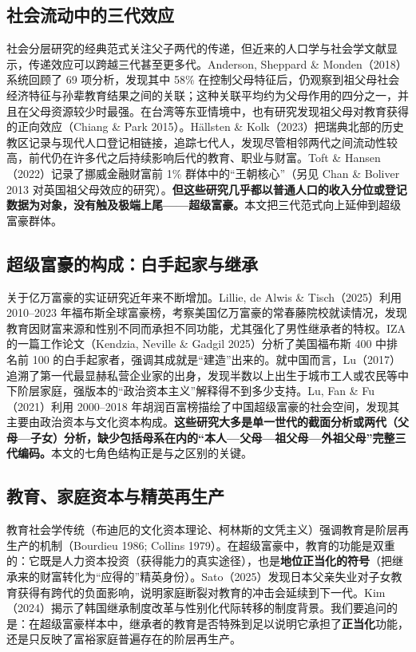 \documentclass[UTF8,a4paper,11pt]{ctexart}
\begin{document}
\subsection{社会流动中的三代效应}

社会分层研究的经典范式关注父子两代的传递，但近来的人口学与社会学文献显示，传递效应可以跨越三代甚至更多代。Anderson, Sheppard \& Monden（2018）系统回顾了 69 项分析，发现其中 58\% 在控制父母特征后，仍观察到祖父母社会经济特征与孙辈教育结果之间的关联；这种关联平均约为父母作用的四分之一，并且在父母资源较少时最强。在台湾等东亚情境中，也有研究发现祖父母对教育获得的正向效应（Chiang \& Park 2015）。Hällsten \& Kolk（2023）把瑞典北部的历史教区记录与现代人口登记相链接，追踪七代人，发现尽管相邻两代之间流动性较高，前代仍在许多代之后持续影响后代的教育、职业与财富。Toft \& Hansen（2022）记录了挪威金融财富前 1\% 群体中的“王朝核心”（另见 Chan \& Boliver 2013 对英国祖父母效应的研究）。\textbf{但这些研究几乎都以普通人口的收入分位或登记数据为对象，没有触及极端上尾——超级富豪。}本文把三代范式向上延伸到超级富豪群体。

\subsection{超级富豪的构成：白手起家与继承}

关于亿万富豪的实证研究近年来不断增加。Lillie, de Alwis \& Tisch（2025）利用 2010--2023 年福布斯全球富豪榜，考察美国亿万富豪的常春藤院校就读情况，发现教育因财富来源和性别不同而承担不同功能，尤其强化了男性继承者的特权。IZA 的一篇工作论文（Kendzia, Neville \& Gadgil 2025）分析了美国福布斯 400 中排名前 100 的白手起家者，强调其成就是“建造”出来的。就中国而言，Lu（2017）追溯了第一代最显赫私营企业家的出身，发现半数以上出生于城市工人或农民等中下阶层家庭，强版本的“政治资本主义”解释得不到多少支持。Lu, Fan \& Fu（2021）利用 2000--2018 年胡润百富榜描绘了中国超级富豪的社会空间，发现其主要由政治资本与文化资本构成。\textbf{这些研究大多是单一世代的截面分析或两代（父母—子女）分析，缺少包括母系在内的“本人—父母—祖父母—外祖父母”完整三代编码。}本文的七角色结构正是与之区别的关键。

\subsection{教育、家庭资本与精英再生产}

教育社会学传统（布迪厄的文化资本理论、柯林斯的文凭主义）强调教育是阶层再生产的机制（Bourdieu 1986; Collins 1979）。在超级富豪中，教育的功能是双重的：它既是人力资本投资（获得能力的真实途径），也是\textbf{地位正当化的符号}（把继承来的财富转化为“应得的”精英身份）。Sato（2025）发现日本父亲失业对子女教育获得有跨代的负面影响，说明家庭断裂对教育的冲击会延续到下一代。Kim（2024）揭示了韩国继承制度改革与性别化代际转移的制度背景。我们要追问的是：在超级富豪样本中，继承者的教育是否特殊到足以说明它承担了\textbf{正当化}功能，还是只反映了富裕家庭普遍存在的阶层再生产。
\end{document}
